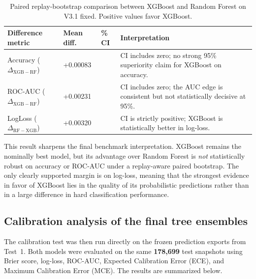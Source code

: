 \documentclass[11pt,a4paper]{article}
\begin{document}
\begin{table}[H]
\centering
\caption{Paired replay-bootstrap comparison between XGBoost and Random Forest on V3.1 fixed. Positive values favor XGBoost.}
\label{tab:bootstrap_xgb_rf}
\begin{tabularx}{\textwidth}{>{\raggedright\arraybackslash}p{3.8cm} >{\centering\arraybackslash}p{2.0cm} >{\centering\arraybackslash}p{3.9cm} >{\raggedright\arraybackslash}X}
\toprule
Difference metric & Mean diff. & 95\% CI & Interpretation \\
\midrule
Accuracy ($\Delta_{\mathrm{XGB-RF}}$) & +0.00083 & [$-0.00179$, $0.00365$] & CI includes zero; no strong 95\% superiority claim for XGBoost on accuracy. \\
ROC-AUC ($\Delta_{\mathrm{XGB-RF}}$) & +0.00231 & [$-0.00096$, $0.00568$] & CI includes zero; the AUC edge is consistent but not statistically decisive at 95\%. \\
LogLoss ($\Delta_{\mathrm{RF-XGB}}$) & +0.00320 & [$0.00089$, $0.00545$] & CI is strictly positive; XGBoost is statistically better in log-loss. \\
\bottomrule
\end{tabularx}
\end{table}

This result sharpens the final benchmark interpretation. XGBoost remains the nominally best model, but its advantage over Random Forest is \emph{not} statistically robust on accuracy or ROC-AUC under a replay-aware paired bootstrap. The only clearly supported margin is on log-loss, meaning that the strongest evidence in favor of XGBoost lies in the quality of its probabilistic predictions rather than in a large difference in hard classification performance.

\subsection{Calibration analysis of the final tree ensembles}
The calibration test was then run directly on the frozen prediction exports from Test~1. Both models were evaluated on the same \textbf{178,699} test snapshots using Brier score, log-loss, ROC-AUC, Expected Calibration Error (ECE), and Maximum Calibration Error (MCE). The results are summarized below.
\end{document}
